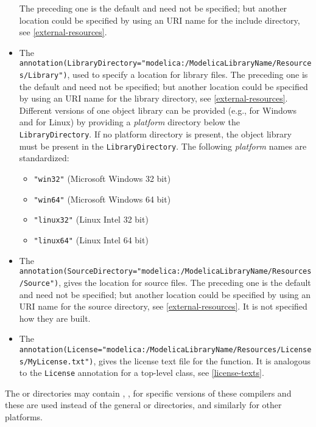 \begin{itemize}
  The preceding one is the default and need not be specified; but another location could be specified by using an URI name for the include directory, see \cref{external-resources}.
\item
  The
  {\lstinline!annotation(LibraryDirectory="modelica:/ModelicaLibraryName/Resources/Library")!}, used to specify a location for library files.
  The preceding one is the default and need not be specified; but another location could be specified by using an URI name for the library directory, see \cref{external-resources}.
  Different versions of one object library can be provided (e.g., for Windows and for Linux) by providing a \emph{platform} directory below the {\lstinline!LibraryDirectory!}.
  If no platform directory is present, the object library must be present in the {\lstinline!LibraryDirectory!}.
  The following \emph{platform} names are standardized:
  \begin{itemize}
  \item
    {\lstinline!"win32"!} (Microsoft Windows 32 bit)
  \item
    {\lstinline!"win64"!} (Microsoft Windows 64 bit)
  \item
    {\lstinline!"linux32"!} (Linux Intel 32 bit)
  \item
    {\lstinline!"linux64"!} (Linux Intel 64 bit)
  \end{itemize}
\item
  The
  {\lstinline!annotation(SourceDirectory="modelica:/ModelicaLibraryName/Resources/Source")!}, gives the location for source files.
  The preceding one is the default and need not be specified; but another location could be specified by using an URI name for the source directory, see \cref{external-resources}.
  It is not specified how they are built.
\item
  The {\lstinline!annotation(License="modelica:/ModelicaLibraryName/Resources/Licenses/MyLicense.txt")!}, gives the license text file for the function.
  It is analogous to the \lstinline!License! annotation for a top-level class, see \cref{license-texts}.
\end{itemize}

The  or  directories may contain , ,  for specific versions of these compilers and these are used instead of the general  or  directories, and similarly for other platforms.

